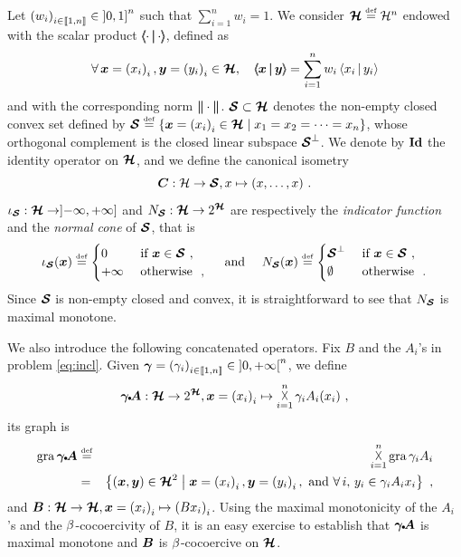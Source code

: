 Let $\pa{w_i}_{i \in \bbket{1,n}} \in {]0,1]}^n$ such that $\sum_{i=1}^n w_i = 1$. We consider $\bHh \eqdef \Hh^n$ endowed with the scalar product $\bdprod{\cdot}{\cdot}$, defined as
%
\begin{equation*}
  \foralls \bx = \pa{x_i}_i, \by = \pa{y_i}_i \in \bHh, \quad \bdprod{\bx}{\by} = \sum_{i=1}^n w_i \dprod{x_i}{y_i}
\end{equation*}
% 
and with the corresponding norm $\bnorm{\cdot}$. $\bSs \subset \bHh$ denotes the non-empty closed convex set defined by $\bSs \eqdef \setdef{ \bx = \pa{x_i}_i \in \bHh}{x_1 = x_2 = \cdots = x_n}$, whose orthogonal complement is the closed linear subspace $\bSs^\bot$. We denote by $\bId$ the identity operator on $\bHh$, and we define the canonical isometry 
%
\[ \bC: \Hh \to \bSs, x \mapsto (x,\ldots,x)~. \]
%
${ \iota_{\bSs} : \bHh \to ]\minfty,\pinfty] }$ and $N_{\bSs}: \bHh \to 2^{\bHh}$ are respectively the \textit{indicator function} and the \textit{normal cone} of $\bSs$, that is
%
\[
\iota_{\bSs}(\bx) \eqdef 
\begin{cases}
 0			& \sobjs{if}  \bx \in \bSs~, \\ 
 \pinfty		& \sobjs{otherwise}~,
 \end{cases} \quad \sobjs{and} \quad
N_{\bSs}(\bx) \eqdef 
\begin{cases}
 \bSs^\bot  & \sobjs{if}  \bx \in \bSs~, \\ 
 \emptyset   & \sobjs{otherwise}~.
 \end{cases}
\]
%
Since $\bSs$ is non-empty closed and convex, it is straightforward to see that $N_{\bSs}$ is maximal monotone.

We also introduce the following concatenated operators. Fix $B$ and the $A_i$'s in problem \eqref{eq:incl}. Given $\bga = \pa{\ga_i}_{i \in \bbket{1,n}} \in {]0,\pinfty[}^n$, we define
%
\[
	{\bgaA : \bHh \to 2^{\bHh}}, \bx = \pa{x_i}_i \mapsto \bigtimes_{i=1}^n \ga_i A_i(x_i)~,
\]
%
\ie its graph is
%
\begin{eqnarray*}
\gra \bgaA & \eqdef & \bigtimes_{i=1}^n \gra \ga_i A_i\\
	       & =      & \setdef{(\bx,\by) \in {\bHh}^2}{\bx = \pa{x_i}_i, \by = \pa{y_i}_i, \sobjs{and} \foralls i, \, y_i \in \ga_i A_i x_i}~,
\end{eqnarray*}
%
and $\bB : \bHh \to \bHh, \bx = \pa{x_i}_i \mapsto \pa{B x_i}_i$. Using the maximal monotonicity of the $A_i$'s and the $\be$-cocoercivity of $B$, it is an easy exercise to establish that $\bgaA$ is maximal monotone and $\bB$ is $\be$-cocoercive on $\bHh$.

